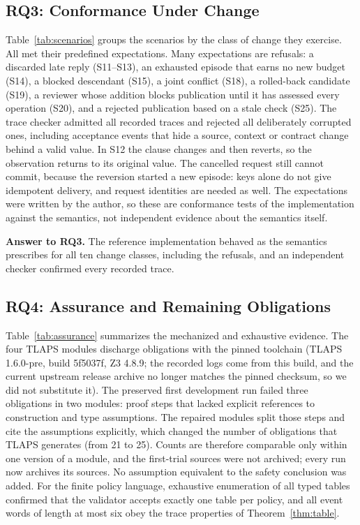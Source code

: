 \subsection{RQ3: Conformance Under Change}\label{sec:rq3}
Table~\ref{tab:scenarios} groups the \Scenarios{} scenarios by the class of change they exercise. All \ScenarioPasses{} met their predefined expectations. Many expectations are refusals: a discarded late reply (S11--S13), an exhausted episode that earns no new budget (S14), a blocked descendant (S15), a joint conflict (S18), a rolled-back candidate (S19), a reviewer whose addition blocks publication until it has assessed every operation (S20), and a rejected publication based on a stale check (S25). The trace checker admitted all \Scenarios{} recorded traces and rejected all \Corruptions{} deliberately corrupted ones, including acceptance events that hide a source, context or contract change behind a valid value. In S12 the clause changes and then reverts, so the observation returns to its original value. The cancelled request still cannot commit, because the reversion started a new episode: keys alone do not give idempotent delivery, and request identities are needed as well. The expectations were written by the author, so these are conformance tests of the implementation against the semantics, not independent evidence about the semantics itself.



\textbf{Answer to RQ3.} The reference implementation behaved as the semantics prescribes for all ten change classes, including the refusals, and an independent checker confirmed every recorded trace.

\subsection{RQ4: Assurance and Remaining Obligations}\label{sec:rq4}
Table~\ref{tab:assurance} summarizes the mechanized and exhaustive evidence. The four TLAPS modules discharge \ProvedObligations{} obligations with the pinned toolchain (TLAPS 1.6.0-pre, build 5f5037f, Z3 4.8.9; the recorded logs come from this build, and the current upstream release archive no longer matches the pinned checksum, so we did not substitute it). The preserved first development run failed three obligations in two modules: proof steps that lacked explicit references to construction and type assumptions. The repaired modules split those steps and cite the assumptions explicitly, which changed the number of obligations that TLAPS generates (from 21 to 25). Counts are therefore comparable only within one version of a module, and the first-trial sources were not archived; every run now archives its sources. No assumption equivalent to the safety conclusion was added. For the finite policy language, exhaustive enumeration of all \PolicyTables{} typed tables confirmed that the validator accepts exactly one table per policy, and all \EventWords{} event words of length at most six obey the trace properties of Theorem~\ref{thm:table}.

